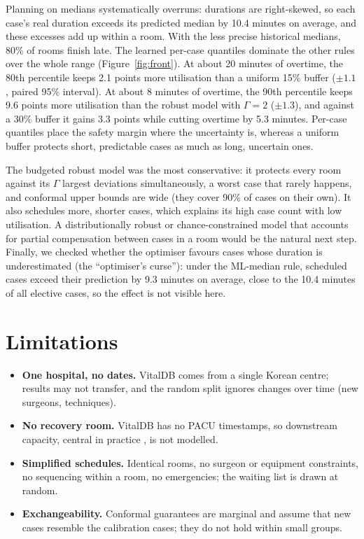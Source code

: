 \documentclass[11pt,a4paper]{article}
\begin{document}
Planning on medians systematically overruns: durations are right-skewed, so each case's real duration exceeds its
predicted median by 10.4 minutes on average, and these excesses add up within a room. With the less precise historical
medians, 80\% of rooms finish late. The learned per-case quantiles dominate the other rules over the whole range
(Figure~\ref{fig:front}). At about 20 minutes of overtime, the 80th percentile keeps 2.1 points more utilisation than a
uniform 15\% buffer ($\pm1.1$, paired 95\% interval). At about 8 minutes of overtime, the 90th percentile keeps 9.6 points
more utilisation than the robust model with $\Gamma=2$ ($\pm1.3$), and against a 30\% buffer it gains 3.3 points while
cutting overtime by 5.3 minutes. Per-case quantiles place the safety margin where the uncertainty is, whereas a uniform
buffer protects short, predictable cases as much as long, uncertain ones.

The budgeted robust model was the most conservative: it protects every room against its $\Gamma$ largest deviations
simultaneously, a worst case that rarely happens, and conformal upper bounds are wide (they cover 90\% of cases on their
own). It also schedules more, shorter cases, which explains its high case count with low utilisation. A
distributionally robust or chance-constrained model that accounts for partial compensation between cases in a room would
be the natural next step. Finally, we checked whether the optimiser favours cases whose duration is underestimated (the
``optimiser's curse''): under the ML-median rule, scheduled cases exceed their prediction by 9.3 minutes on average,
close to the 10.4 minutes of all elective cases, so the effect is not visible here.

\section{Limitations}
\begin{itemize}
  \item \textbf{One hospital, no dates.} VitalDB comes from a single Korean centre; results may not transfer, and the
        random split ignores changes over time (new surgeons, techniques).
  \item \textbf{No recovery room.} VitalDB has no PACU timestamps, so downstream capacity, central in practice
        \cite{shehadeh2022}, is not modelled.
  \item \textbf{Simplified schedules.} Identical rooms, no surgeon or equipment constraints, no sequencing within a
        room, no emergencies; the waiting list is drawn at random.
  \item \textbf{Exchangeability.} Conformal guarantees are marginal and assume that new cases resemble the calibration
        cases; they do not hold within small groups.
\end{itemize}
\end{document}
